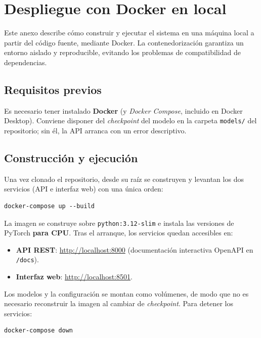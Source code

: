 %
\chapter{Despliegue con Docker en local}
\label{anexo::docker-local}


Este anexo describe cómo construir y ejecutar el sistema en una máquina local a partir
del código fuente, mediante Docker. La contenedorización garantiza un entorno aislado y
reproducible, evitando los problemas de compatibilidad de dependencias.

\section{Requisitos previos}
\label{anexo::docker-local_req}

Es necesario tener instalado \textbf{Docker} (y \textit{Docker Compose}, incluido en
Docker Desktop). Conviene disponer del \textit{checkpoint} del modelo en la carpeta
\texttt{models/} del repositorio; sin él, la API arranca con un error descriptivo.

\section{Construcción y ejecución}
\label{anexo::docker-local_run}

Una vez clonado el repositorio, desde su raíz se construyen y levantan los dos
servicios (API e interfaz web) con una única orden:

\begin{verbatim}
docker-compose up --build
\end{verbatim}

La imagen se construye sobre \texttt{python:3.12-slim} e instala las versiones de
PyTorch \textbf{para CPU}. Tras el arranque, los servicios quedan accesibles en:

\begin{itemize}
  \item \textbf{API REST}: \url{http://localhost:8000} (documentación interactiva
        OpenAPI en \texttt{/docs}).
  \item \textbf{Interfaz web}: \url{http://localhost:8501}.
\end{itemize}

Los modelos y la configuración se montan como volúmenes, de modo que no es necesario
reconstruir la imagen al cambiar de \textit{checkpoint}. Para detener los servicios:

\begin{verbatim}
docker-compose down
\end{verbatim}

